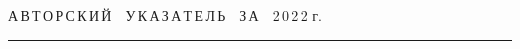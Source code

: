 




\def\stat{cont}


{%




\raggedleft\Large \bf%


А\,В\,Т\,О\,Р\,С\,К\,И\,Й\ \ У\,К\,А\,З\,А\,Т\,Е\,Л\,Ь\ \ З\,А\ \ 2\,0\,2\,2 г. \vskip 17pt


 \hrule


 \par


 }







\label{st\stat}

















\def\leftkol{\ } %


\def\rightkol{\ } %






















\def\leftfootline{\small{\textbf{\thepage}


\hfill СИСТЕМЫ И СРЕДСТВА ИНФОРМАТИКИ\ \ \ выпуск~32\ \ \ №~4\ \ \ 2022}


}%


 \def\rightfootline{\small{СИСТЕМЫ И СРЕДСТВА ИНФОРМАТИКИ\ \ \ выпуск~31\ \ \


№~4\ \ \ 2021


 \hfill \textbf{\thepage}}}





